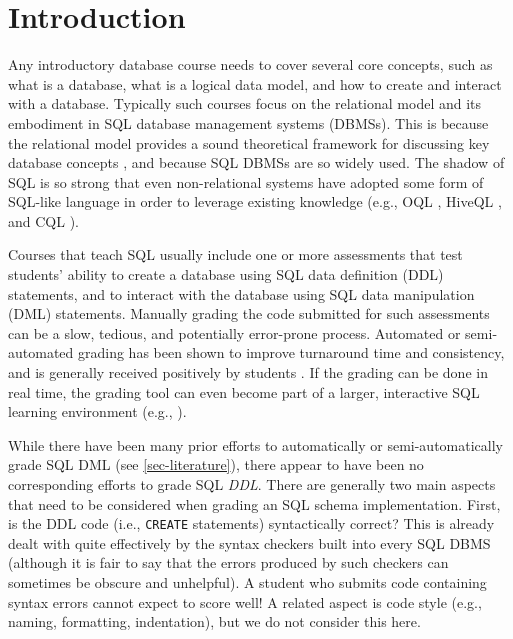 \documentclass[sigconf, review, anonymous, capitalise]{acmart}
\begin{document}

\maketitle


\section{Introduction}

Any introductory database course needs to cover several core concepts, such as what is a database, what is a logical data model, and how to create and interact with a database. Typically such courses focus on the relational model and its embodiment in SQL database management systems (DBMSs). This is because the relational model provides a sound theoretical framework for discussing key database concepts \cite{Date.C-2009a-SQL-and-Relational}, and because SQL DBMSs are so widely used. The shadow of SQL is so strong that even non-relational systems have adopted some form of SQL-like language in order to leverage existing knowledge (e.g., OQL \cite{Cattell.R-2000a-ODMG3}, HiveQL \cite{Apache-2017a-Hive}, and CQL \cite{Apache-2017a-CQL}).

Courses that teach SQL usually include one or more assessments that test students' ability to create a database using SQL data definition (DDL) statements, and to interact with the database using SQL data manipulation (DML) statements. Manually grading the code submitted for such assessments can be a slow, tedious, and potentially error-prone process. Automated or semi-automated grading has been shown to improve turnaround time and consistency, and is generally received positively by students \cite{Douce.C-2005a-Automatic,Russell.G-2004a-Improving,Dekeyser.S-2007a-Computer,Prior.J-2004a-Backwash}. If the grading can be done in real time, the grading tool can even become part of a larger, interactive SQL learning environment (e.g.,  \cite{Kenny.C-2005a-Automated,Kleiner.C-2013a-Automated,Mitrovic.A-1998a-Learning,Russell.G-2004a-Improving,Sadiq.S-2004a-SQLator}).

While there have been many prior efforts to automatically or semi-automatically grade SQL DML (see \cref{sec-literature}), there appear to have been no corresponding efforts to grade SQL \emph{DDL}. There are generally two main aspects that need to be considered when grading an SQL schema implementation. First, is the DDL code (i.e., \texttt{CREATE} statements) syntactically correct? This is already dealt with quite effectively by the syntax checkers built into every SQL DBMS (although it is fair to say that the errors produced by such checkers can sometimes be obscure and unhelpful). A student who submits code containing syntax errors cannot expect to score well! A related aspect is code style (e.g., naming, formatting, indentation), but we do not consider this here.
    
\end{document}
